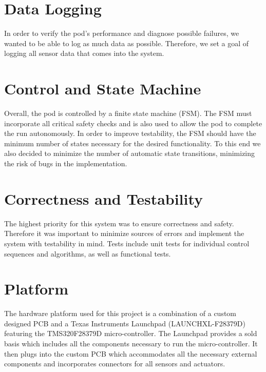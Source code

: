 \section{Data Logging}

In order to verify the pod's performance and diagnose possible failures, we wanted to be able to log as much data as possible. Therefore, we set a goal of logging all sensor data that comes into the system.


\section{Control and State Machine}

Overall, the pod is controlled by a finite state machine (FSM). The FSM must incorporate all critical safety checks and is also used to allow the pod to complete the run autonomously. In order to improve testability, the FSM should have the minimum number of states necessary for the desired functionality. To this end we also decided to minimize the number of automatic state transitions, minimizing the risk of bugs in the implementation.

\section{Correctness and Testability}

The highest priority for this system was to ensure correctness and safety. Therefore it was important to minimize sources of errors and implement the system with testability in mind. Tests include unit tests for individual control sequences and algorithms, as well as functional tests.

\section{Platform}

The hardware platform used for this project is a combination of a custom designed PCB and a Texas Instruments Launchpad (LAUNCHXL-F28379D) featuring the TMS320F28379D micro-controller. The Launchpad provides a sold basis which includes all the components necessary to run the micro-controller. It then plugs into the custom PCB which accommodates all the necessary external components and incorporates connectors for all sensors and actuators.


